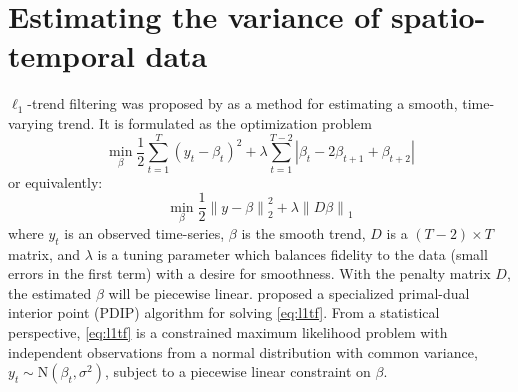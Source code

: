 \documentclass{article}
\newcommand{\norm}[1]{\left\lVert #1 \right\rVert}
\begin{document}
\section{Estimating the variance of spatio-temporal data}
\label{sec:ell_1-trend-filt}


$\ell_1$-trend filtering was proposed by \citep{KimKoh2009} as a method for estimating a smooth, time-varying trend. It is formulated as the optimization problem
\begin{equation}
\min_{\beta} \frac{1}{2} \sum_{t=1}^{T} (y_t-\beta_t)^2+\lambda
\sum_{t=1}^{T-2} \left|\beta_t-2\beta_{t+1}+\beta_{t+2}\right| 
\end{equation}
or equivalently:
\begin{equation}
\min_{\beta} \frac{1}{2} \norm{ y-\beta }_2^2+\lambda \norm{ D\beta}_1
\label{eq:l1tf}
\end{equation}
 where $y_t$ is an observed time-series, $\beta$ is the smooth trend,
 $D$ is a $(T-2)\times T$ matrix, and $\lambda$ is a tuning parameter
 which balances fidelity to the data (small errors in the first term)
 with a desire for smoothness.  
With the penalty matrix $D$, the estimated $\beta$ will be piecewise
linear. \citep{KimKoh2009} proposed a specialized primal-dual
interior point (PDIP) algorithm for solving \eqref{eq:l1tf}. From a
statistical perspective, \eqref{eq:l1tf} is a constrained maximum
likelihood problem with independent observations from a normal
distribution with common variance, $y_t \sim \mbox{N}(\beta_t,
\sigma^2)$, subject to a piecewise linear constraint on $\beta$. 
\end{document}
